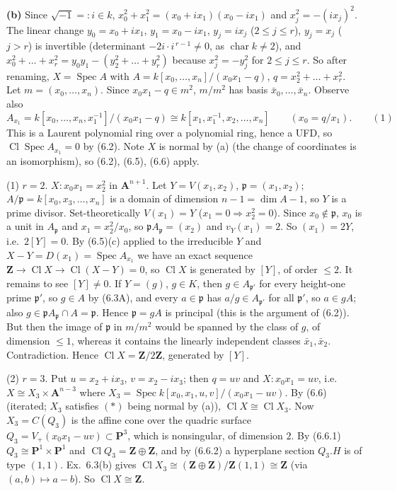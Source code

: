 \documentclass[11pt]{article}
\begin{document}
\textbf{(b)} Since $\sqrt{-1}=:i\in k$, $x_0^2+x_1^2=(x_0+ix_1)(x_0-ix_1)$ and $x_j^2=-(ix_j)^2$. The linear change $y_0=x_0+ix_1$, $y_1=x_0-ix_1$, $y_j=ix_j$ ($2\le j\le r$), $y_j=x_j$ ($j>r$) is invertible (determinant $-2i\cdot i^{\,r-1}\ne0$, as $\operatorname{char}k\ne2$), and $x_0^2+\dots+x_r^2=y_0y_1-(y_2^2+\dots+y_r^2)$ because $x_j^2=-y_j^2$ for $2\le j\le r$. So after renaming, $X=\operatorname{Spec}A$ with $A=k[x_0,\dots,x_n]/(x_0x_1-q)$, $q=x_2^2+\dots+x_r^2$. Let $m=(x_0,\dots,x_n)$. Since $x_0x_1-q\in m^2$, $m/m^2$ has basis $\bar x_0,\dots,\bar x_n$. Observe also
\[
A_{x_1}=k[x_0,\dots,x_n,x_1^{-1}]/(x_0x_1-q)\cong k[x_1,x_1^{-1},x_2,\dots,x_n]\qquad(x_0=q/x_1).\qquad(1)
\]
This is a Laurent polynomial ring over a polynomial ring, hence a UFD, so $\operatorname{Cl}\operatorname{Spec}A_{x_1}=0$ by (6.2). Note $X$ is normal by (a) (the change of coordinates is an isomorphism), so (6.2), (6.5), (6.6) apply.

(1) $r=2$. $X:x_0x_1=x_2^2$ in $\mathbf A^{n+1}$. Let $Y=V(x_1,x_2)$, $\mathfrak p=(x_1,x_2)$; $A/\mathfrak p=k[x_0,x_3,\dots,x_n]$ is a domain of dimension $n-1=\dim A-1$, so $Y$ is a prime divisor. Set-theoretically $V(x_1)=Y$ ($x_1=0\Rightarrow x_2^2=0$). Since $x_0\notin\mathfrak p$, $x_0$ is a unit in $A_{\mathfrak p}$ and $x_1=x_2^2/x_0$, so $\mathfrak pA_{\mathfrak p}=(x_2)$ and $v_Y(x_1)=2$. So $(x_1)=2Y$, i.e.\ $2[Y]=0$. By (6.5)(c) applied to the irreducible $Y$ and $X-Y=D(x_1)=\operatorname{Spec}A_{x_1}$ we have an exact sequence $\mathbf Z\to\operatorname{Cl}X\to\operatorname{Cl}(X-Y)=0$, so $\operatorname{Cl}X$ is generated by $[Y]$, of order $\le2$. It remains to see $[Y]\ne0$. If $Y=(g)$, $g\in K$, then $g\in A_{\mathfrak p'}$ for every height-one prime $\mathfrak p'$, so $g\in A$ by (6.3A), and every $a\in\mathfrak p$ has $a/g\in A_{\mathfrak p'}$ for all $\mathfrak p'$, so $a\in gA$; also $g\in\mathfrak pA_{\mathfrak p}\cap A=\mathfrak p$. Hence $\mathfrak p=gA$ is principal (this is the argument of (6.2)). But then the image of $\mathfrak p$ in $m/m^2$ would be spanned by the class of $g$, of dimension $\le1$, whereas it contains the linearly independent classes $\bar x_1,\bar x_2$. Contradiction. Hence $\operatorname{Cl}X=\mathbf Z/2\mathbf Z$, generated by $[Y]$.

(2) $r=3$. Put $u=x_2+ix_3$, $v=x_2-ix_3$; then $q=uv$ and $X:x_0x_1=uv$, i.e.\ $X\cong X_3\times\mathbf A^{n-3}$ where $X_3=\operatorname{Spec}k[x_0,x_1,u,v]/(x_0x_1-uv)$. By (6.6) (iterated; $X_3$ satisfies $(*)$ being normal by (a)), $\operatorname{Cl}X\cong\operatorname{Cl}X_3$. Now $X_3=C(Q_3)$ is the affine cone over the quadric surface $Q_3=V_+(x_0x_1-uv)\subset\mathbf P^3$, which is nonsingular, of dimension $2$. By (6.6.1) $Q_3\cong\mathbf P^1\times\mathbf P^1$ and $\operatorname{Cl}Q_3=\mathbf Z\oplus\mathbf Z$, and by (6.6.2) a hyperplane section $Q_3.H$ is of type $(1,1)$. Ex.~6.3(b) gives $\operatorname{Cl}X_3\cong(\mathbf Z\oplus\mathbf Z)/\mathbf Z(1,1)\cong\mathbf Z$ (via $(a,b)\mapsto a-b$). So $\operatorname{Cl}X\cong\mathbf Z$.
\end{document}
